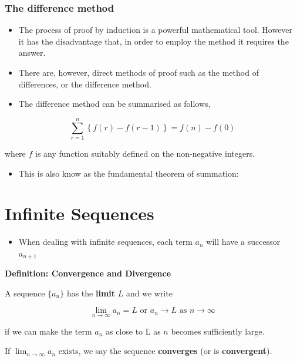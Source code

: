 \documentclass[]{book}
\providecommand{\tightlist}{%
  \setlength{\itemsep}{0pt}\setlength{\parskip}{0pt}}
\begin{document}
\hypertarget{the-difference-method}{%
\subsubsection{The difference method}\label{the-difference-method}}

\begin{itemize}
\tightlist
\item
  The process of proof by induction is a powerful mathematical tool. However it has the disadvantage that, in order to employ the method it requires the answer.
\item
  There are, however, direct methods of proof such as the method of differences, or the difference method.
\item
  The difference method can be summarised as follows,
\end{itemize}

\[\sum_{r=1}^n \left\{f(r)-f(r-1) \right\} = f(n) - f(0)\]

where \(f\) is any function suitably defined on the non-negative integers.

\begin{itemize}
\tightlist
\item
  This is also know as the fundamental theorem of summation:
\end{itemize}

\hypertarget{infinite-sequences}{%
\section{Infinite Sequences}\label{infinite-sequences}}

\begin{itemize}
\tightlist
\item
  When dealing with infinite sequences, each term \(a_{n}\) will have a successor \(a_{n+1}\)
\end{itemize}

\textbf{Definition: Convergence and Divergence}

A sequence \(\{a_n\}\) has the \textbf{limit} \(L\) and we write

\[\lim_{n\rightarrow \infty}a_n=L \text{ or } a_n \rightarrow L \text{ as } n\rightarrow \infty\]

if we can make the term \(a_n\) as close to L as \(n\) becomes sufficiently large.

If \(\lim_{n\rightarrow \infty}a_n\) exists, we say the sequence \textbf{converges} (or is \textbf{convergent}).
\end{document}
